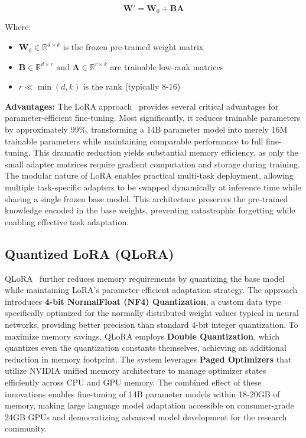 \begin{equation}
\mathbf{W}' = \mathbf{W}_0 + \mathbf{BA}
\end{equation}

Where:
\begin{itemize}[leftmargin=1.2em]
  \item $\mathbf{W}_0 \in \mathbb{R}^{d \times k}$ is the frozen pre-trained weight matrix
  \item $\mathbf{B} \in \mathbb{R}^{d \times r}$ and $\mathbf{A} \in \mathbb{R}^{r \times k}$ are trainable low-rank matrices
  \item $r \ll \min(d, k)$ is the rank (typically 8-16)
\end{itemize}

\textbf{Advantages:} The LoRA approach~\cite{hu2022lora} provides several critical advantages for parameter-efficient fine-tuning. Most significantly, it reduces trainable parameters by approximately 99\%, transforming a 14B parameter model into merely 16M trainable parameters while maintaining comparable performance to full fine-tuning. This dramatic reduction yields substantial memory efficiency, as only the small adapter matrices require gradient computation and storage during training. The modular nature of LoRA enables practical multi-task deployment, allowing multiple task-specific adapters to be swapped dynamically at inference time while sharing a single frozen base model. This architecture preserves the pre-trained knowledge encoded in the base weights, preventing catastrophic forgetting while enabling effective task adaptation.

\subsection{Quantized LoRA (QLoRA)}

QLoRA~\cite{dettmers2023qlora} further reduces memory requirements by quantizing the base model while maintaining LoRA's parameter-efficient adaptation strategy. The approach introduces \textbf{4-bit NormalFloat (NF4) Quantization}, a custom data type specifically optimized for the normally distributed weight values typical in neural networks, providing better precision than standard 4-bit integer quantization. To maximize memory savings, QLoRA employs \textbf{Double Quantization}, which quantizes even the quantization constants themselves, achieving an additional reduction in memory footprint. The system leverages \textbf{Paged Optimizers} that utilize NVIDIA unified memory architecture to manage optimizer states efficiently across CPU and GPU memory. The combined effect of these innovations enables fine-tuning of 14B parameter models within 18-20GB of memory, making large language model adaptation accessible on consumer-grade 24GB GPUs and democratizing advanced model development for the research community.

